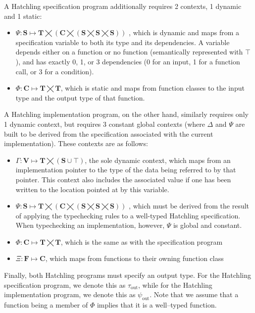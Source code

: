 A Hatchling specification program additionally requires 2 contexts, 1 dynamic and 1 static:
\begin{itemize}
\item 
$\Psi:\mathbf{S}\mapsto
\mathbf{T}\bigtimes
\left(\mathbf{C}\bigtimes
\left(\mathbf{S}\bigtimes\mathbf{S}\bigtimes\mathbf{S}\right)
\right)$
, which is dynamic and maps from a specification variable to both its type and its dependencies.  A variable depends either on a function or no function (semantically represented with $\top$), and has exactly 0, 1, or 3 dependencies (0 for an input, 1 for a function call, or 3 for a condition).
\item $\Phi:\mathbf{C}\mapsto\mathbf{T}\bigtimes\mathbf{T}$, which is static and maps from function classes to the input type and the output type of that function.
\end{itemize}

A Hatchling implementation program, on the other hand, similarly requires only 1 dynamic context, but requires 3 constant global contexts (where $\Delta$ and $\Psi$ are built to be derived from the specification associated with the current implementation).  These contexts are as follows:
\begin{itemize}
\item $\Gamma:\mathbf{V}\mapsto\mathbf{T}\bigtimes\left(\mathbf{S}\cup\top\right)$, the sole dynamic context, which maps from an implementation pointer to the type of the data being referred to by that pointer.  This context also includes the associated value if one has been written to the location pointed at by this variable.
\item $\Psi:\mathbf{S}\mapsto
\mathbf{T}\bigtimes
\left(\mathbf{C}\bigtimes
\left(\mathbf{S}\bigtimes\mathbf{S}\bigtimes\mathbf{S}\right)
\right)$
, which must be derived from the result of applying the typechecking rules to a well-typed Hatchling specification.  When typechecking an implementation, however, $\Psi$ is global and constant.
\item $\Phi:\mathbf{C}\mapsto\mathbf{T}\bigtimes\mathbf{T}$, which is the same as with the specification program
\item $\Xi:\mathbf{F}\mapsto\mathbf{C}$, which maps from functions to their owning function class
\end{itemize}

Finally, both Hatchling programs must specify an output type.  For the Hatchling specification program, we denote this as $\tau_\textrm{out}$, while for the Hatchling implementation program, we denote this as $\psi_\textrm{out}$.  Note that we assume that a function being a member of $\Phi$ implies that it is a well--typed function.

